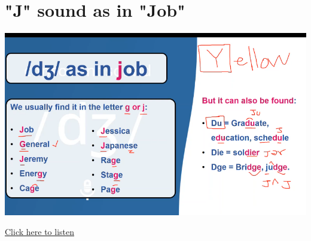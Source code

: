 \section{"J" sound as in "Job" \textipa{[d\textyogh]}}
\begin{center}
\includegraphics[width=1\textwidth]{images/j_portrait.png}
\end{center}

\href{https://drive.google.com/file/d/1jjBc2nYIz9DPCFFiDWo1M4h6dzX020iO/view?usp=sharing}{Click here to listen}

